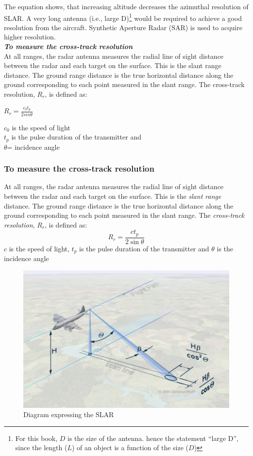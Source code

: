 The equation shows, that increasing altitude decreases the azimuthal resolution of SLAR. A very long antenna (i.e., large D)\footnote{For this book, $D$ is the size of the antenna. hence the statement \textquotedblleft large D\textquotedblright, since the length ($L$) of an object is a function of the size ($D$)} would be required to achieve a good resolution from the aircraft. Synthetic Aperture Radar (SAR) is used to acquire higher resolution.\\

\textit{\textbf{To measure the cross-track resolution }}\\
At all ranges, the radar antenna measures the radial line of sight distance between the radar and each target on the surface. This is the slant range distance. The ground range distance is the true horizontal distance along the ground corresponding to each point measured in the slant range. The cross-track resolution, $R_{r}$, is defined as:  
\begin{center}
$R_{r}=\frac{c_{0} t_{p}}{2 sin\theta}$
\end{center}
$c_{0}$ is the speed of light\\
$t_{p}$ is the pulse duration of the transmitter and\\
$\theta$= incidence angle

\subsubsection*{To measure the cross-track resolution}
At all ranges, the radar antenna measures the radial line of sight distance between the radar and each target on the surface. This is the \textit{slant range} distance. The ground range distance is the true horizontal distance along the ground corresponding to each point measured in the slant range. The \textit{cross-track resolution}, $R_{r}$, is defined as:  
\begin{dmath*}
R_{r}=\frac{ct_{p}}{2\sin\theta}
\end{dmath*}
$c$ is the speed of light, $t_{p}$ is the pulse duration of the transmitter and $\theta$ is the incidence angle
\begin{figure}[h]
\centering
\includegraphics[scale=0.3]{./graphics/fig 1.19(SLAR)}
\caption{Diagram expressing the SLAR}
\end{figure}

